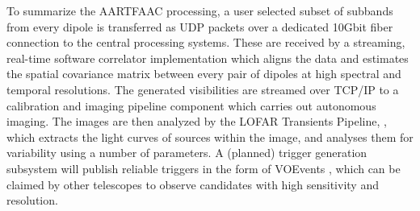 \documentclass{ws-jai}
\begin{document}

To summarize  the AARTFAAC processing, a  user selected subset of  subbands from
every  dipole is  transferred  as  UDP packets  over  a  dedicated 10Gbit  fiber
connection  to  the  central  processing  systems.   These  are  received  by  a
streaming, real-time  software correlator  implementation which aligns  the data
and estimates  the spatial covariance  matrix between  every pair of  dipoles at
high spectral and temporal resolutions.  The generated visibilities are streamed
over TCP/IP  to a calibration and  imaging pipeline component which  carries out
autonomous  imaging.  The  images  are  then analyzed  by  the LOFAR  Transients
Pipeline, \citep[TraP;][]{swinbank2015lofar}, which extracts the light curves of
sources within  the image, and analyses  them for variability using  a number of
parameters.   A (planned)  trigger  generation subsystem  will publish  reliable
triggers  in  the form  of  VOEvents  \cite{williams2006voevent}, which  can  be
claimed  by other  telescopes to  observe candidates  with high  sensitivity and
resolution.
\end{document}
